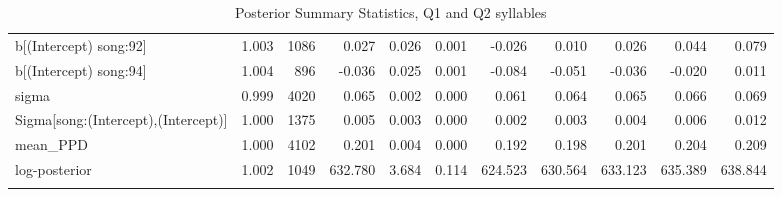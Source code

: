 \begin{longtable}{lrrrrrrrrrr}
  b[(Intercept) song:92] & 1.003 & 1086 & 0.027 & 0.026 & 0.001 & -0.026 & 0.010 & 0.026 & 0.044 & 0.079 \\ 
  b[(Intercept) song:94] & 1.004 &  896 & -0.036 & 0.025 & 0.001 & -0.084 & -0.051 & -0.036 & -0.020 & 0.011 \\ 
  sigma & 0.999 & 4020 & 0.065 & 0.002 & 0.000 & 0.061 & 0.064 & 0.065 & 0.066 & 0.069 \\ 
  Sigma[song:(Intercept),(Intercept)] & 1.000 & 1375 & 0.005 & 0.003 & 0.000 & 0.002 & 0.003 & 0.004 & 0.006 & 0.012 \\ 
  mean\_PPD & 1.000 & 4102 & 0.201 & 0.004 & 0.000 & 0.192 & 0.198 & 0.201 & 0.204 & 0.209 \\ 
  log-posterior & 1.002 & 1049 & 632.780 & 3.684 & 0.114 & 624.523 & 630.564 & 633.123 & 635.389 & 638.844 \\ 
   \bottomrule

\caption{Posterior Summary Statistics, Q1 and Q2 syllables} 
   \label{durStrictus}
\end{longtable}

%





